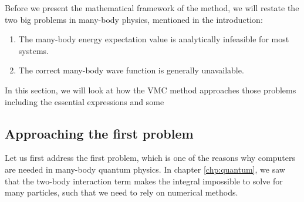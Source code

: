 Before we present the mathematical framework of the method, we will restate the two big problems in many-body physics, mentioned in the introduction:
\begin{enumerate}
	\item The many-body energy expectation value is analytically infeasible for most systems.
	\item The correct many-body wave function is generally unavailable.
\end{enumerate}
In this section, we will look at how the VMC method approaches those problems including the essential expressions and some 

\subsection{Approaching the first problem}
Let us first address the first problem, which is one of the reasons why computers are needed in many-body quantum physics. In chapter \ref{chp:quantum}, we saw that the two-body interaction term makes the integral impossible to solve for many particles, such that we need to rely on numerical methods. 

